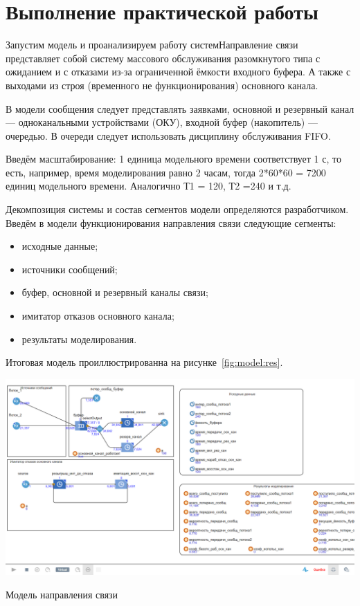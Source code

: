 \section*{\LARGE Выполнение практической работы}
Запустим модель и проанализируем работу системНаправление связи
представляет собой систему массового обслуживания разомкнутого типа с
ожиданием и с отказами из-за ограниченной ёмкости входного буфера. А также
с выходами из строя (временного не функционирования) основного канала.\par
В модели сообщения следует представлять заявками, основной
и резервный канал — одноканальными устройствами (ОКУ), 
входной буфер (накопитель) — очередью. В очереди следует
использовать дисциплину обслуживания FIFO.\par
Введём масштабирование: 1 единица модельного времени
соответствует 1 с, то есть, например, время моделирования равно 2
часам, тогда 2*60*60 = 7200 единиц модельного времени.
Аналогично Т1 = 120, Т2 =240 и т.д.\par
Декомпозиция системы и состав сегментов модели
определяются разработчиком. Введём в модели
функционирования направления связи следующие сегменты:

\begin{itemize}
	\item исходные данные;
	\item источники сообщений;
	\item буфер, основной и резервный каналы связи;
	\item имитатор отказов основного канала;
	\item результаты моделирования.
\end{itemize}

Итоговая модель проиллюстрированна на рисунке~\ref{fig:model:res}.

\begin{image}
	\includegraphics[width=1\textwidth]{png1}
	\caption{Модель направления связи}
	\label{fig:model:res}
\end{image}

